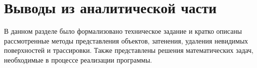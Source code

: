 \section*{Выводы из аналитической части}
В данном разделе было формализовано техническое задание и
кратко описаны рассмотренные методы представления объектов,
затенения, удаления невидимых поверхностей и трассировки.
Также представлены решения математических задач, необходимые в процессе
реализации программы.